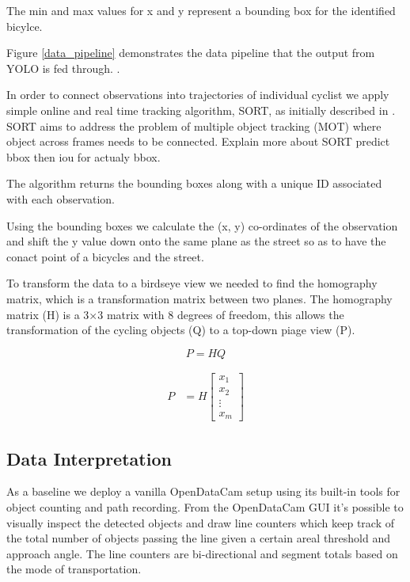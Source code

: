 \documentclass[
10pt, %
a4paper, %
oneside, %
headinclude,footinclude, %
] {book}%
\begin{document}
The min and max values for x and y represent a bounding box for the identified bicylce.

Figure \ref{data_pipeline} demonstrates the data pipeline that the output from YOLO is fed through. .

In order to connect observations into trajectories of individual cyclist we apply 
simple online and real time tracking algorithm, SORT, as initially described in \cite{Bewley2016_sort}. 
SORT aims to address the problem of multiple object tracking (MOT) where object across frames needs to be connected. 
Explain more about SORT predict bbox then iou for actualy bbox.

The algorithm returns the bounding boxes along with a unique ID associated with each observation.

Using the bounding boxes we calculate the (x, y) co-ordinates of the observation and shift the y value down onto 
the same plane as the street so as to have the conact point of a bicycles and the street.

To transform the data to a birdseye view we needed to find the homography matrix, which is a transformation matrix between two planes.
The homography matrix (H) is a 3×3 matrix with 8 degrees of freedom, this allows the transformation of the cycling objects (Q) to a 
top-down piage view (P). 

\[ P = HQ \]

  \begin{align}
    P &= H\begin{bmatrix}
           x_{1} \\
           x_{2} \\
           \vdots \\
           x_{m}
         \end{bmatrix}
  \end{align}


\subsection{Data Interpretation}
As a baseline we deploy a vanilla OpenDataCam setup using its built-in tools for object counting and path recording.
From the OpenDataCam GUI it's possible to visually inspect the detected objects and draw line counters 
which keep track of the total number of objects passing the line given a certain areal threshold and approach angle. 
The line counters are bi-directional and segment totals based on the mode of transportation.
\end{document}
